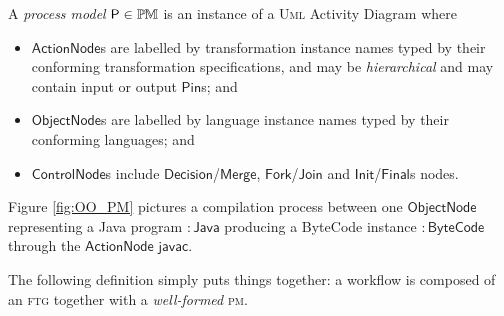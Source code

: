 
\begin{Definition}
A \emph{process model} $\mathsf{P}\in\mathbb{P}\mskip-1mu\mathbb{M}$ is an instance of a \textsc{Uml}
Activity Diagram where
\begin{itemize}
   \item $\mathsf{ActionNode}$s are labelled by transformation instance names 
typed by their conforming transformation specifications, and may be 
\emph{hierarchical} and may contain input or output $\mathsf{Pin}$s; and 
   \item $\mathsf{ObjectNode}$s are labelled by language instance names typed 
by their conforming languages; and 
   \item $\mathsf{ControlNode}$s include 
$\mathsf{Decision}$/$\mathsf{Merge}$, $\mathsf{Fork}$/$\mathsf{Join}$ and 
$\mathsf{Init}$/$\mathsf{Final}$s nodes.   
\end{itemize}
\end{Definition}
Figure \ref{fig:OO_PM} pictures a compilation process between one 
$\mathsf{ObjectNode}$ representing a Java program $\mathsf{:Java}$ producing a 
ByteCode instance $\mathsf{:ByteCode}$ through the  $\mathsf{ActionNode}$ 
$\mathsf{javac}$.

\medskip
The following definition simply puts things together: a workflow is composed of 
an \textsc{ftg} together with a \emph{well-formed} \textsc{pm}. 



